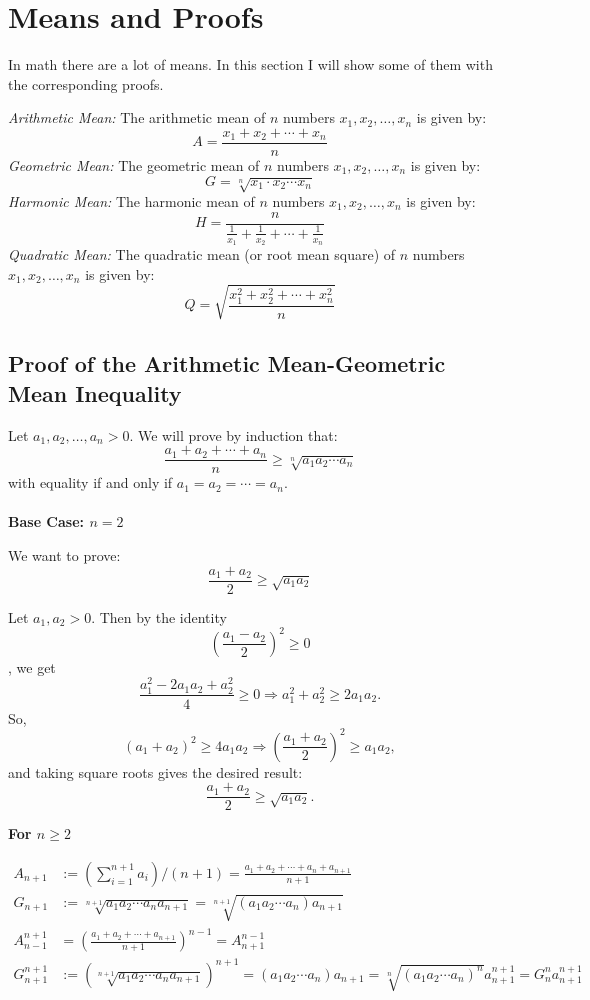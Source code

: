 \newpage
\section{Means and Proofs}
In math there are a lot of means. In this section I will show some of them with the corresponding proofs.

\emph{Arithmetic Mean:} The arithmetic mean of \( n \) numbers \( x_1, x_2, \dots, x_n \) is given by:
	      \[
		      A = \frac{x_1 + x_2 + \cdots + x_n}{n}
	      \]
\emph{Geometric Mean:} The geometric mean of \( n \) numbers \( x_1, x_2, \dots, x_n \) is given by:
	      \[
		      G = \sqrt[n]{x_1 \cdot x_2 \cdots x_n}
	      \]
\emph{Harmonic Mean:} The harmonic mean of \( n \) numbers \( x_1, x_2, \dots, x_n \) is given by:
	      \[
		      H = \frac{n}{\frac{1}{x_1} + \frac{1}{x_2} + \cdots + \frac{1}{x_n}}
	      \]
\emph{Quadratic Mean:} The quadratic mean (or root mean square) of \( n \) numbers \( x_1, x_2, \dots, x_n \) is given by:
	      \[
		      Q = \sqrt{\frac{x_1^2 + x_2^2 + \cdots + x_n^2}{n}}
	      \]

\subsection{Proof of the Arithmetic Mean-Geometric Mean Inequality}

Let \( a_1, a_2, \dots, a_n > 0 \). We will prove by induction that:
\[
	\frac{a_1 + a_2 + \cdots + a_n}{n} \geq \sqrt[n]{a_1 a_2 \cdots a_n}
\]
with equality if and only if \( a_1 = a_2 = \cdots = a_n \).
\\\\
\textbf{Base Case: \( n = 2 \)}

We want to prove:
\[
	\frac{a_1 + a_2}{2} \geq \sqrt{a_1 a_2}
\]

Let \( a_1, a_2 > 0 \). Then by the identity
\[
	{\left( \frac{a_1 - a_2}{2} \right)}^2 \geq 0
\]
, we get
\[
	\frac{a_1^2 - 2a_1a_2 + a_2^2}{4} \geq 0 \Rightarrow a_1^2 + a_2^2 \geq 2a_1a_2.
\]
So,
\[
	{(a_1 + a_2)}^2 \geq 4a_1a_2 \Rightarrow {\left( \frac{a_1 + a_2}{2} \right)}^2 \geq a_1a_2,
\]
and taking square roots gives the desired result:
\[
	\frac{a_1 + a_2}{2} \geq \sqrt{a_1 a_2}.
\]

\textbf{For \( n \geq 2 \)}

\begin{align*}
	A_{n + 1} &:= (\sum_{i=1}^{n + 1} a_i) / (n + 1) = \frac{a_1 + a_2 + \cdots + a_n + a_{n + 1}}{n + 1}\\
	G_{n + 1} &:= \sqrt[n + 1]{a_1 a_2 \cdots a_n a_{n + 1}} = \sqrt[n + 1]{(a_1 a_2 \cdots a_n) a_{n + 1}}\\
	A_{n - 1}^{n + 1}&= {(\frac{a_1 + a_2 + \cdots + a_{n + 1}}{n + 1})}^{n - 1} = A_{n + 1}^{n - 1}\\
	G_{n + 1}^{n + 1} &:= {(\sqrt[n + 1]{a_1 a_2 \cdots a_n a_{n + 1}})}^{n + 1} = (a_1 a_2 \cdots a_n) a_{n + 1} = \sqrt[n]{{(a_1 a_2 \cdots a_n)}^{n}} a_{n + 1}^{n + 1} = G_{n}^{n} a_{n + 1}^{n + 1}
\end{align*}

